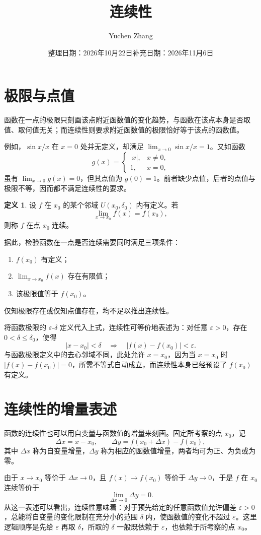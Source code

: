 \documentclass[UTF8,fontset=fandol,a4paper,12pt]{ctexart}
\title{连续性}
\author{Yuchen Zhang}
\date{整理日期：2026年10月22日\quad 补充日期：2026年11月6日}
\makeatletter
\newcommand{\U}{U}
\theoremstyle{definition}
\newtheorem*{definition}{定义}
\renewcommand{\maketitle}{\begin{center}
{\LARGE\bfseries \@title\par}\vspace{0.6em}
\@author\par\vspace{0.2em}{\small\@date\par}
\end{center}}
\makeatother
\begin{document}
\maketitle

\section{极限与点值}
函数在一点的极限只刻画该点附近函数值的变化趋势，与函数在该点本身是否取值、取何值无关；而连续性则要求附近函数值的极限恰好等于该点的函数值。

例如，$\sin x/x$ 在 $x=0$ 处并无定义，却满足 $\lim_{x\to0}\sin x/x=1$。又如函数
\[
 g(x)=\begin{cases}|x|,&x\ne0,\\1,&x=0,\end{cases}
\]
虽有 $\lim_{x\to0}g(x)=0$，但其点值为 $g(0)=1$。前者缺少点值，后者的点值与极限不等，因而都不满足连续性的要求。

\begin{definition}
设 $f$ 在 $x_0$ 的某个邻域 $\U(x_0,\delta_0)$ 内有定义。若
\[
 \boxed{\lim_{x\to x_0}f(x)=f(x_0),}
\]
则称 $f$ 在点 $x_0$ 连续。
\end{definition}

据此，检验函数在一点是否连续需要同时满足三项条件：
\begin{enumerate}
 \item $f(x_0)$ 有定义；
 \item $\lim_{x\to x_0}f(x)$ 存在有限值；
 \item 该极限值等于 $f(x_0)$。
\end{enumerate}
仅知极限存在或仅知点值存在，均不足以推出连续性。

将函数极限的 $\varepsilon$-$\delta$ 定义代入上式，连续性可等价地表述为：对任意 $\varepsilon>0$，存在 $0<\delta\le\delta_0$，使得
\[
 |x-x_0|<\delta\quad\Longrightarrow\quad
 |f(x)-f(x_0)|<\varepsilon.
\]
与函数极限定义中的去心邻域不同，此处允许 $x=x_0$，因为当 $x=x_0$ 时 $|f(x)-f(x_0)|=0$，所需不等式自动成立，而连续性本身已经预设了 $f(x_0)$ 有定义。

\section{连续性的增量表述}
函数的连续性也可以用自变量与函数值的增量来刻画。固定所考察的点 $x_0$，记
\[
 \Delta x=x-x_0,\qquad
 \Delta y=f(x_0+\Delta x)-f(x_0),
\]
其中 $\Delta x$ 称为自变量增量，$\Delta y$ 称为相应的函数值增量，两者均可为正、为负或为零。

由于 $x\to x_0$ 等价于 $\Delta x\to0$，且 $f(x)\to f(x_0)$ 等价于 $\Delta y\to0$，于是 $f$ 在 $x_0$ 连续等价于
\[
 \boxed{\lim_{\Delta x\to0}\Delta y=0.}
\]
从这一表述可以看出，连续性意味着：对于预先给定的任意函数值允许偏差 $\varepsilon>0$，总能将自变量的变化限制在充分小的范围 $\delta$ 内，使函数值的变化不超过 $\varepsilon$。这里逻辑顺序是先给 $\varepsilon$ 再取 $\delta$，所取的 $\delta$ 一般既依赖于 $\varepsilon$，也依赖于所考察的点 $x_0$。
\end{document}

